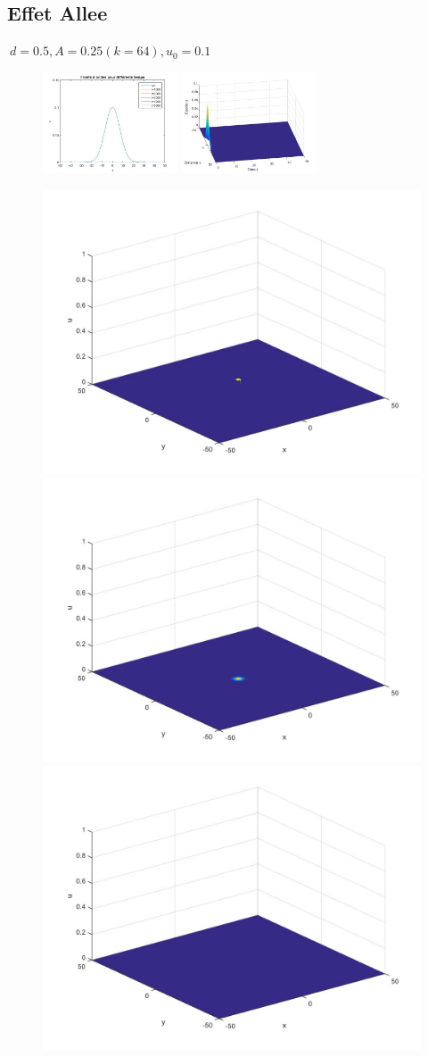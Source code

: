 \documentclass[10pt]{beamer}
\begin{document}
\subsection{Effet Allee}
\begin{frame}{$\ d=0.5, A=0.25 (k=64), u_0=0.1$}{}
\begin{figure}[H]
	\centering
	\includegraphics[width=0.40\linewidth, height=3cm]{Allee/F2311}\hfill
	\includegraphics[width=0.55\linewidth, height=3cm]{Allee/F4311}
\end{figure}
\begin{figure}[H]
	\centering
	\includegraphics[width=0.3\linewidth]{Allee/311__1_}\hfill
    \includegraphics[width=0.3\linewidth]{Allee/311__2_}\hfill
	\includegraphics[width=0.3\linewidth]{Allee/311__3_}
\end{figure}
\end{frame}
\end{document}
